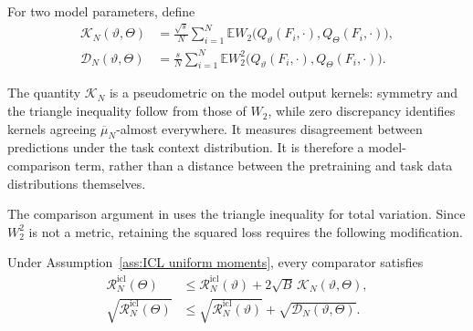 \begin{definition}
\label{def:ICL model discrepancy}
For two model parameters, define
\begin{align}
\mathcal K_N(\vartheta,\Theta)
&=\frac{\sqrt s}{N}\sum_{i=1}^N
\mathbb E W_2\bigl(Q_\vartheta(F_i,\cdot),Q_\Theta(F_i,\cdot)\bigr),
\label{eq:ICL population discrepancy}\\
\mathcal D_N(\vartheta,\Theta)
&=\frac{s}{N}\sum_{i=1}^N
\mathbb E W_2^2\bigl(Q_\vartheta(F_i,\cdot),Q_\Theta(F_i,\cdot)\bigr).
\label{eq:ICL squared discrepancy}
\end{align}
\end{definition}

The quantity \(\mathcal K_N\) is a pseudometric on the model output kernels: symmetry and the triangle inequality follow from those of \(W_2\), while zero discrepancy identifies kernels agreeing \(\overline\mu_N\)-almost everywhere. It measures disagreement between predictions under the task context distribution. It is therefore a model-comparison term, rather than a distance between the pretraining and task data distributions themselves.

The comparison argument in \cite[Theorem~6.1]{ZekriEtAl2025} uses the triangle inequality for total variation. Since \(W_2^2\) is not a metric, retaining the squared loss requires the following modification.

\begin{lemma}
\label{lem:ICL risk comparison}
Under Assumption~\ref{ass:ICL uniform moments}, every comparator satisfies
\begin{align}
\mathcal R_N^{\mathrm{icl}}(\Theta)
&\leqslant\mathcal R_N^{\mathrm{icl}}(\vartheta)
+2\sqrt B\,\mathcal K_N(\vartheta,\Theta),
\label{eq:ICL linear comparison}\\
\sqrt{\mathcal R_N^{\mathrm{icl}}(\Theta)}
&\leqslant\sqrt{\mathcal R_N^{\mathrm{icl}}(\vartheta)}
+\sqrt{\mathcal D_N(\vartheta,\Theta)}.
\label{eq:ICL root comparison}
\end{align}
\end{lemma}

